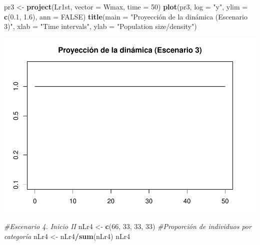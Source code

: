 \documentclass[
]{book}
\newenvironment{Shaded}{\begin{snugshade}}{\end{snugshade}}
\newcommand{\AttributeTok}[1]{\textcolor[rgb]{0.13,0.29,0.53}{#1}}
\newcommand{\CommentTok}[1]{\textcolor[rgb]{0.56,0.35,0.01}{\textit{#1}}}
\newcommand{\ConstantTok}[1]{\textcolor[rgb]{0.56,0.35,0.01}{#1}}
\newcommand{\DecValTok}[1]{\textcolor[rgb]{0.00,0.00,0.81}{#1}}
\newcommand{\FloatTok}[1]{\textcolor[rgb]{0.00,0.00,0.81}{#1}}
\newcommand{\FunctionTok}[1]{\textcolor[rgb]{0.13,0.29,0.53}{\textbf{#1}}}
\newcommand{\NormalTok}[1]{#1}
\newcommand{\OtherTok}[1]{\textcolor[rgb]{0.56,0.35,0.01}{#1}}
\newcommand{\SpecialCharTok}[1]{\textcolor[rgb]{0.81,0.36,0.00}{\textbf{#1}}}
\newcommand{\StringTok}[1]{\textcolor[rgb]{0.31,0.60,0.02}{#1}}
\theoremstyle{definition}
\theoremstyle{definition}
\theoremstyle{definition}
\theoremstyle{definition}
\theoremstyle{remark}
\begin{document}
\begin{Shaded}
\begin{Highlighting}[]
\NormalTok{pr3 }\OtherTok{\textless{}{-}} \FunctionTok{project}\NormalTok{(Lr1st, }\AttributeTok{vector =}\NormalTok{ Wmax, }\AttributeTok{time =} \DecValTok{50}\NormalTok{)}
\FunctionTok{plot}\NormalTok{(pr3, }\AttributeTok{log =} \StringTok{"y"}\NormalTok{, }\AttributeTok{ylim =} \FunctionTok{c}\NormalTok{(}\FloatTok{0.1}\NormalTok{, }\FloatTok{1.6}\NormalTok{), }\AttributeTok{ann =} \ConstantTok{FALSE}\NormalTok{)}
\FunctionTok{title}\NormalTok{(}\AttributeTok{main =} \StringTok{"Proyección de la dinámica (Escenario 3)"}\NormalTok{, }\AttributeTok{xlab =} \StringTok{"Time intervals"}\NormalTok{, }\AttributeTok{ylab =} \StringTok{"Population size/density"}\NormalTok{)}
\end{Highlighting}
\end{Shaded}

\includegraphics{Diagnostico_Poblacional_files/figure-latex/chap10_4-6.pdf}

\begin{Shaded}
\begin{Highlighting}[]
\CommentTok{\#Escenario 4. Inicio II}
\NormalTok{nLr4 }\OtherTok{\textless{}{-}} \FunctionTok{c}\NormalTok{(}\DecValTok{66}\NormalTok{, }\DecValTok{33}\NormalTok{, }\DecValTok{33}\NormalTok{, }\DecValTok{33}\NormalTok{)}
\CommentTok{\#Proporción de individuos por categoría}
\NormalTok{nLr4 }\OtherTok{\textless{}{-}}\NormalTok{ nLr4}\SpecialCharTok{/}\FunctionTok{sum}\NormalTok{(nLr4)}
\NormalTok{nLr4}
\end{Highlighting}
\end{Shaded}
\end{document}
